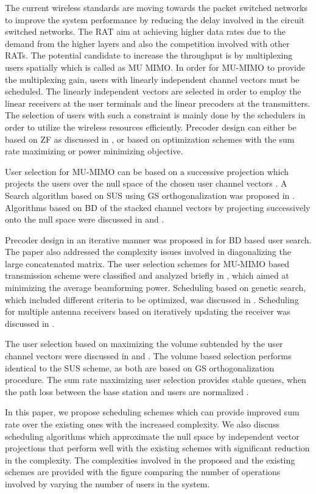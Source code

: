 The current wireless standards are moving towards the packet switched networks to improve the system performance by reducing the delay involved in the circuit switched networks. The \ac{RAT} aim at achieving higher data rates due to the demand from the higher layers and also the competition involved with other \ac{RAT}s. The potential candidate to increase the throughput is by multiplexing users spatially which is called as \ac{MU} \ac{MIMO}. In order for MU-MIMO to provide the multiplexing gain, users with linearly independent channel vectors must be scheduled. The linearly independent vectors are selected in order to employ the linear receivers at the user terminals and the linear precoders at the transmitters. The selection of users with such a constraint is mainly done by the schedulers in order to utilize the wireless resources efficiently. Precoder design can either be based on \ac{ZF} as discussed in \cite{spencer2004zero}, \cite{wiesel2008zero} or based on optimization schemes with the sum rate maximizing or power minimizing objective.

User selection for MU-MIMO can be based on a successive projection which projects the users over the null space of the chosen user channel vectors \cite{shen2006low}. A Search algorithm based on \ac{SUS} using \ac{GS} orthogonalization was proposed in \cite{sus2006zfbf}. Algorithms based on \ac{BD} of the stacked channel vectors by projecting successively onto the null space were discussed in \cite{shen2006low} and \cite{youtuan2007improved}.

Precoder design in an iterative manner was proposed in \cite{traniterative} for BD based user search. The paper also addressed the complexity issues involved in diagonalizing the large concatenated matrix. The user selection schemes for MU-MIMO based transmission scheme were classified and analyzed briefly in \cite{zhang2007user}, which aimed at minimizing the average beamforming power. Scheduling based on genetic search, which included different criteria to be optimized, was discussed in \cite{genetic_search}. Scheduling for multiple antenna receivers based on iteratively updating the receiver was discussed in \cite{antti_user_selection}.

The user selection based on maximizing the volume subtended by the user channel vectors were discussed in \cite{ko2012determinant} and \cite{jin2010novel}. The volume based selection performs identical to the \ac{SUS} scheme, as both are based on \ac{GS} orthogonalization procedure. The sum rate maximizing user selection provides stable queues, when the path loss between the base station and users are normalized \cite{queuevsinfo}.

In this paper, we propose scheduling schemes which can provide improved sum rate over the existing ones with the increased complexity. We also discuss scheduling algorithms which approximate the null space by independent vector projections that perform well with the existing schemes with significant reduction in the complexity. The complexities involved in the proposed and the existing schemes are provided with the figure comparing the number of operations involved by varying the number of users in the system.

